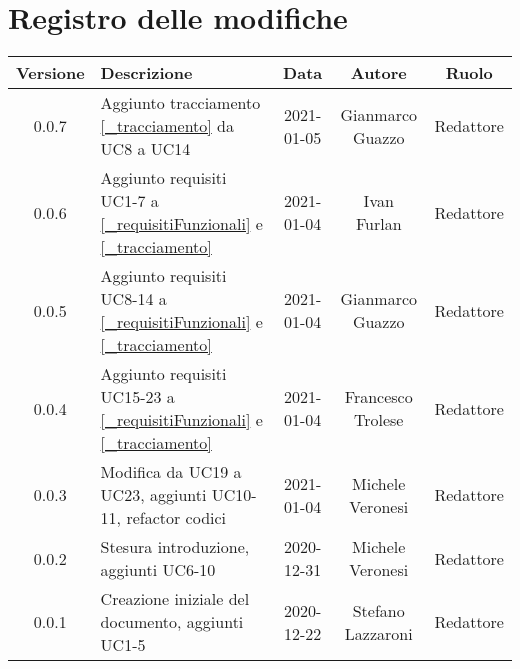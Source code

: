 \section*{Registro delle modifiche}

\begin{center}
	\begin{longtable}{|c|p{5cm}|c|c|c|}
	\hline
	\rowcolor{lighter-grayer}
	\textbf{Versione} & \textbf{Descrizione} & \textbf{Data} & \textbf{Autore} & \textbf{Ruolo} \\
	\hline
	\endfirsthead


	\hline
	0.0.7 & Aggiunto tracciamento \ref{_tracciamento} da UC8 a UC14 & 2021-01-05 & Gianmarco Guazzo & Redattore \\
	0.0.6 & Aggiunto requisiti UC1-7 a \ref{_requisitiFunzionali} e \ref{_tracciamento} & 2021-01-04 & Ivan Furlan & Redattore \\
	0.0.5 & Aggiunto requisiti UC8-14 a \ref{_requisitiFunzionali} e \ref{_tracciamento} & 2021-01-04 & Gianmarco Guazzo & Redattore \\
	0.0.4 & Aggiunto requisiti UC15-23 a \ref{_requisitiFunzionali} e \ref{_tracciamento} & 2021-01-04 & Francesco Trolese & Redattore \\
	0.0.3 & Modifica da UC19 a UC23, aggiunti UC10-11, refactor codici & 2021-01-04 & Michele Veronesi & Redattore \\
	0.0.2 & Stesura introduzione, aggiunti UC6-10 & 2020-12-31 & Michele Veronesi & Redattore\\
    0.0.1 & Creazione iniziale del documento, aggiunti UC1-5 & 2020-12-22 & Stefano Lazzaroni & Redattore\\
	\hline

	\end{longtable}
\end{center}